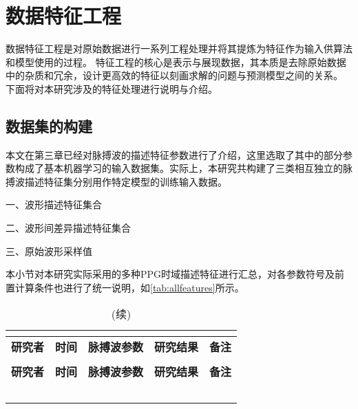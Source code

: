 \section{数据特征工程}
数据特征工程是对原始数据进行一系列工程处理并将其提炼为特征作为输入供算法和模型使用的过程\cite{Zhou2016,Aurélien2018}。
特征工程的核心是表示与展现数据，其本质是去除原始数据中的杂质和冗余，设计更高效的特征以刻画求解的问题与预测模型之间的关系。
下面将对本研究涉及的特征处理进行说明与介绍。

\subsection{数据集的构建}
本文在第三章已经对脉搏波的描述特征参数进行了介绍，这里选取了其中的部分参数构成了基本机器学习的输入数据集。实际上，本研究共构建了三类相互独立的脉搏波描述特征集分别用作特定模型的训练输入数据。

一、波形描述特征集合



二、波形间差异描述特征集合

三、原始波形采样值


本小节对本研究实际采用的多种PPG时域描述特征进行汇总，对各参数符号及前置计算条件也进行了统一说明，如\autoref{tab:allfeatures}所示。
\begin{center}
    \fontsize{10}{4}
    \begin{longtable}{p{3cm}<{\centering}p{1cm}<{\centering}p{2cm}<{\centering}p{6cm}<{\centering}p{1cm}<{\centering}}
        \caption{本研究使用的所有PPG时域指标一览}\\
        \label{tab:allfeatures}\\
        \hline\hline
            \textbf{研究者}&\textbf{时间}&\textbf{脉搏波参数}&\textbf{研究结果}&\textbf{备注}\\
        \hline
        \endfirsthead
        \caption[]{(续)}\\
        \hline
            \textbf{研究者}&\textbf{时间}&\textbf{脉搏波参数}&\textbf{研究结果}&\textbf{备注}\\
        \hline
        \endhead 
        \hline
        \endfoot
        \hline\hline
        \endlastfoot
        &       &       &       &  \\
        &       &       &       &  \\
        &       &       &       &  \\
        &       &       &       &  \\
        &       &       &       &  \\
    \end{longtable}
\end{center}
